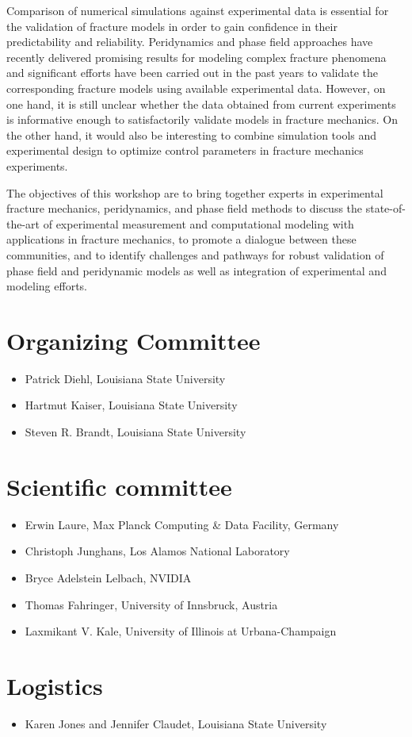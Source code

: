 Comparison of numerical simulations against experimental data is essential
for the validation of fracture models in order to gain confidence in their
predictability and reliability. Peridynamics and phase field approaches have recently
delivered promising results for modeling complex fracture phenomena and significant
efforts have been carried out in the past years to validate the corresponding
fracture models using available experimental data. However, on one hand, it is still
unclear whether the data obtained from current experiments is informative enough to
satisfactorily validate models in fracture mechanics. On the other hand, it would also be
interesting to combine simulation tools and experimental design to optimize
control parameters in fracture mechanics experiments.

The objectives of this workshop are to bring together experts in experimental fracture mechanics,
peridynamics, and phase field methods to discuss the state-of-the-art of experimental
measurement and computational modeling with applications in fracture mechanics, to promote
a dialogue between these communities, and to identify challenges and pathways for robust validation
of phase field and peridynamic models as well as integration of experimental and modeling efforts.

\section*{Organizing Committee}
\begin{itemize}
\item Patrick Diehl, Louisiana State University
\item Hartmut Kaiser, Louisiana State University
\item Steven R. Brandt, Louisiana State University
\end{itemize}

\section*{Scientific committee}
\begin{itemize}
\item Erwin Laure, Max Planck Computing \& Data Facility, Germany
\item Christoph Junghans, Los Alamos National Laboratory
\item Bryce Adelstein Lelbach, NVIDIA
\item Thomas Fahringer, University of Innsbruck, Austria
\item Laxmikant V. Kale,  University of Illinois at Urbana-Champaign
\end{itemize}

\section*{Logistics}
\begin{itemize}
\item Karen Jones and Jennifer Claudet, Louisiana State University
\end{itemize}
